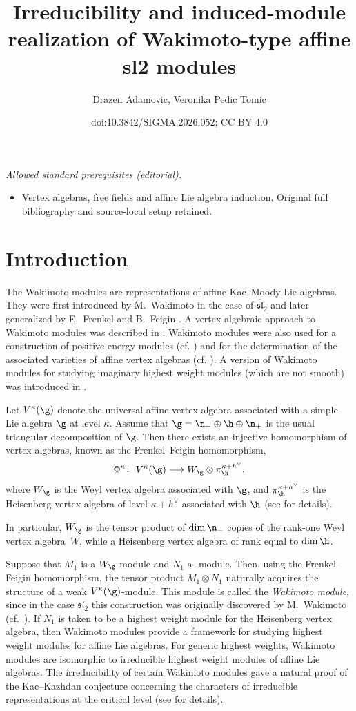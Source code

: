 \documentclass[10pt,a4paper]{amsart}
\title{Irreducibility and induced-module realization of Wakimoto-type affine sl2 modules}
\author{Drazen Adamovic, Veronika Pedic Tomic}
\date{doi:10.3842/SIGMA.2026.052; CC BY 4.0}
\numberwithin{equation}{section}
\theoremstyle{definition}
\newcommand{\1}{\textbf{1}}
\begin{document}
\maketitle
\noindent\textit{Allowed standard prerequisites (editorial).}\begin{itemize}
\item Vertex algebras, free fields and affine Lie algebra induction. Original full bibliography and source-local setup retained.
\end{itemize}\medskip
\section{Introduction}

The Wakimoto modules are representations of affine Kac--Moody Lie algebras.
They were first introduced by M.~Wakimoto \cite{Wak} in the case of $\widehat{\mathfrak{sl}}_{2}$
and later generalized by E.~Frenkel and B.~Feigin \cite{FF,FF2,FF1}.
A vertex-algebraic approach to Wakimoto modules was described in \cite{efren}.
 Wakimoto modules were also used for a construction of positive energy modules (cf. \cite{FK}) and for the determination of the associated varieties of affine vertex algebras (cf. \cite{AFK}). A version of Wakimoto modules for studying imaginary highest weight modules (which are not smooth) was introduced in \cite{CF, CF2}.

Let $V^{\kappa}(\g)$ denote the universal affine vertex algebra associated with a simple Lie algebra $\g$ at level $\kappa$.
Assume that $\g = {\n}_{-} \oplus {\h} \oplus {\n}_{+}$ is the usual triangular decomposition of $\g$.
Then there exists an injective homomorphism of vertex algebras, known as the Frenkel--Feigin homomorphism,
\[
 \Phi^{\kappa} \colon \ V^{\kappa}(\g) \longrightarrow W_{\g} \otimes \pi_{\h}^{\kappa + h^{\vee}},
\]
where $W_{\g}$ is the Weyl vertex algebra associated with $\g$, and
$\pi_{\h}^{\kappa + h^{\vee}}$ is the Heisenberg vertex algebra of level $\kappa + h^{\vee}$ associated with $\h$
(see \cite{efren} for details).

In particular, $W_{\g}$ is the tensor product of $\dim \n_{-}$ copies of the rank-one Weyl vertex al\-gebra~$W$,
while  a Heisenberg vertex algebra of rank equal to $\dim \h$.

Suppose that $M_1$ is a $W_{\g}$-module and $N_1$ a
-module.
Then, using the Frenkel--Feigin homomorphism, the tensor product $M_1 \otimes N_1$ naturally acquires the structure of a weak $V^{\kappa}(\g)$-module.
This module is called the \emph{Wakimoto module}, since in the case $\mathfrak{sl}_2$ this construction was originally discovered by M.~Wakimoto (cf.~\cite{Wak}).
If $N_1$ is taken to be a highest weight module for the Heisenberg vertex algebra, then Wakimoto modules provide a framework for studying highest weight modules for affine Lie algebras.
For generic highest weights, Wakimoto modules are isomorphic to irreducible highest weight modules of affine Lie algebras.
The irreducibility of certain Wakimoto modules gave a natural proof of the Kac--Kazhdan conjecture \cite{KK} concerning the characters of irreducible representations at the critical level
(see \cite[Section~4]{efren} for details).
\end{document}
